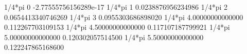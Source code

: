 \documentclass[11pt]{article}
\begin{document}


1/4*pi 0 -2.77555756156289e-17
1/4*pi 1 0.0238876956234986
1/4*pi 2 0.0654413340746269
1/4*pi 3 0.0955303686898020
1/4*pi 4.00000000000000 0.112267703109153
1/4*pi 4.50000000000000 0.117107187799921
1/4*pi 5.00000000000000 0.120302057514500
1/4*pi 5.50000000000000 0.122247865168600

\end{document}
